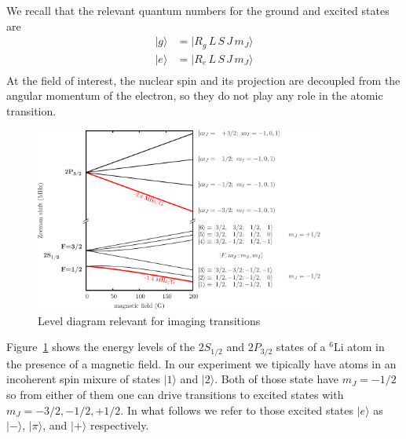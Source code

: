 \documentclass[11pt,letter]{article}
\begin{document}
We recall that the relevant quantum numbers for the ground and excited states are
\begin{align}
|g\rangle & = | R_{g}\, L\,S\,J\,m_{J} \rangle \\
|e\rangle & = | R_{e}\, L\,S\,J\,m_{J} \rangle \\
\end{align}
At the field of interest, the nuclear spin and its projection are decoupled
from the angular momentum of the electron,  so they do not play any role in the
atomic transition.
\begin{figure}[h]
\centering \includegraphics[width=0.85\textwidth]{01eps.pdf}
\caption[Levels relevant for imaging.]{Level diagram relevant for imaging transitions}  \label{fig:levels}
\end{figure}
Figure~\ref{fig:levels} shows the energy levels of the $2S_{1/2}$ and
$2P_{3/2}$ states of a $^{6}$Li atom in the presence of a magnetic field. In
our experiment we tipically have atoms in an incoherent spin mixure of states
$|1\rangle$ and $|2\rangle$.  Both of those state have $m_{J}=-1/2$ so from
either of them one can drive transitions to excited states with $m_{J}=-3/2,
-1/2, +1/2$.  In what follows we refer to those excited states $|e\rangle$ as
$|-\rangle$, $|\pi\rangle$, and $|+\rangle$ respectively. 
\end{document}
